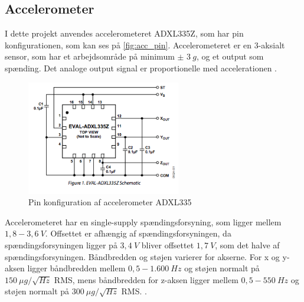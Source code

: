 \subsection{Accelerometer} \label{sec:acc}

I dette projekt anvendes accelerometeret ADXL335Z, som har pin konfigurationen, som kan ses på \autoref{fig:acc_pin}. Accelerometeret er en 3-aksialt sensor, som har et arbejdsområde på minimum $\pm$ $3~g$, og et output som spænding. Det analoge output signal er proportionelle med accelerationen \citep{analogdevices2009}. 


\begin{figure}[H]
\centering
\includegraphics[width=0.6\textwidth]{figures/acc_pin.png}
\caption{Pin konfiguration af accelerometer ADXL335 \citep{analogdevices2009}}
\label{fig:acc_pin}
\end{figure}

\noindent
Accelerometeret har en single-supply spændingsforsyning, som ligger mellem $1,8 - 3,6~V$.  Offsettet er afhængig af spændingsforsyningen, da spændingsforsyningen ligger på $3,4~V$ bliver offsettet $1,7~V$, som det halve af spændingsforsyningen. Båndbredden og støjen varierer for akserne. For x og y-aksen ligger båndbredden mellem $0,5 - 1.600~Hz$ og støjen normalt på $150~\mu g/\sqrt{Hz}$ RMS, mens båndbredden for z-aksen ligger mellem $0,5 - 550~Hz$ og støjen normalt på $300~\mu g/\sqrt{Hz}$ RMS.  \citep{analogdevices2010}. 

